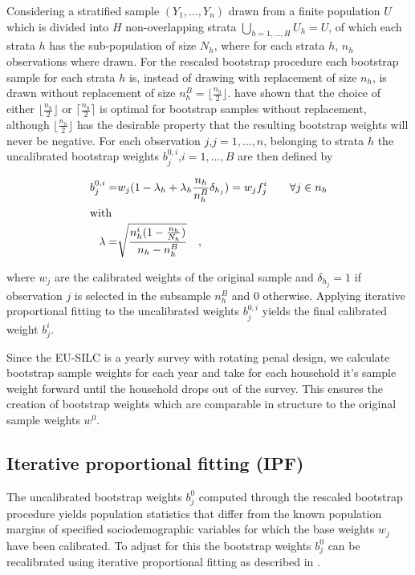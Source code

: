 \documentclass{scrartcl}
\begin{document}
Considering a stratified sample $(Y_1,\ldots,Y_n)$ drawn from a finite population $U$ which is divided into $H$ non-overlapping strata $\bigcup\limits_{h=1,\ldots,H} U_h = U$, of which each strata $h$ has the sub-population of size $N_h$, where for each strata $h$, $n_h$ observations where drawn.
For the rescaled bootstrap procedure each bootstrap sample for each strata $h$ is, instead of drawing with replacement of size $n_h$, is drawn without replacement of size $n_h^B=\lfloor\frac{n_h}{2}\rfloor$. \citep{chipprest2007} have shown that the choice of either $\lfloor\frac{n_h}{2}\rfloor$ or $\lceil\frac{n_h}{2}\rceil$ is optimal for bootstrap samples without replacement, although $\lfloor\frac{n_h}{2}\rfloor$ has the desirable property that the resulting bootstrap weights will never be negative.
For each observation $j$,$j=1,\ldots,n$, belonging to strata $h$ the uncalibrated bootstrap weights $b_{j}^{0,i}$,$i=1,\ldots,B$ are then defined by

\begin{align*}
  b_{j}^{0,i} =& w_j(1-\lambda_h+\lambda_h\frac{n_h}{n_h^B}\delta_{h_j}) = w_jf_j^i \quad\quad \forall j \in n_h\\
  \intertext{with}
  \lambda =& \sqrt{\frac{n_h^i(1-\frac{n_h}{N_h})}{n_h-n_h^B}} \quad ,
\end{align*}

where $w_j$ are the calibrated weights of the original sample and $\delta_{h_j}=1$ if observation $j$ is selected in the subsample $n_h^B$ and 0 otherwise. Applying iterative proportional fitting to the uncalibrated weights $b_{j}^{0,i}$ yields the final calibrated weight $b_{j}^{i}$.

Since the EU-SILC is a yearly survey with rotating penal design, we calculate bootstrap sample weights for each year and take for each household it's sample weight forward until the household drops out of the survey. This ensures the creation of bootstrap weights which are comparable in structure to the original sample weights $w^0$.

\subsection{Iterative proportional fitting (IPF)}
The uncalibrated bootstrap weights $b_j^{0}$ computed through the rescaled bootstrap procedure yields population statistics that differ from the known population margins of specified sociodemographic variables for which the base weights $w_j$ have been calibrated. To adjust for this the bootstrap weights $b_{j}^{0}$ can be recalibrated using iterative proportional fitting as described in \citep{mekogu2016}.\\
\end{document}
